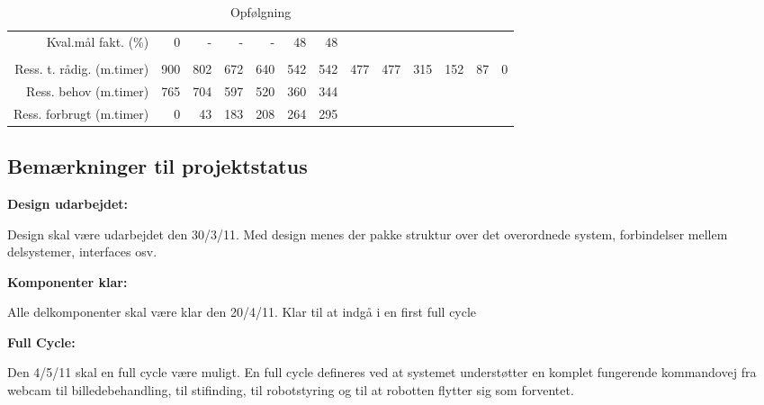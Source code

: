 \begin{sidewaystable}[!htbp]
\begin{scriptsize}
\begin{tabular}{r|rrrrrrrr|rrrr}
    Kval.mål fakt. (\%) & 0     & -   & -   & -   & 48  & 48    &       &       &       &       &  \\
          &       &       &       &       &       &       &       &       &       &       &  \\
    Ress. t. rådig. (m.timer) & 900   & 802   & 672   & 640   & 542   & 542   & 477   & 477   & 315   & 152   & 87    & 0 \\
    Ress. behov (m.timer) & 765   & 704 & 597 & 520   & 360   & 344   &       &       &       &       &   \\
    Ress. forbrugt (m.timer) & 0     & 43    & 183   & 208   & 264   & 295   &       &       &       &       &  \\
    \end{tabular}%
\end{scriptsize}
\caption{Opfølgning}
\end{sidewaystable}


\subsection{Bemærkninger til projektstatus}
\textbf{Design udarbejdet:}

Design skal være udarbejdet den 30/3/11. 
Med design menes der pakke struktur over det overordnede system, forbindelser mellem delsystemer, interfaces osv.

\textbf{Komponenter klar:}

Alle delkomponenter skal være klar den 20/4/11. Klar til at indgå i en first full cycle	

\textbf{Full Cycle:}

Den 4/5/11 skal en full cycle være muligt.
En full cycle defineres ved at systemet understøtter en komplet fungerende kommandovej fra webcam til billedebehandling, til stifinding, til robotstyring og til at robotten flytter sig som forventet.